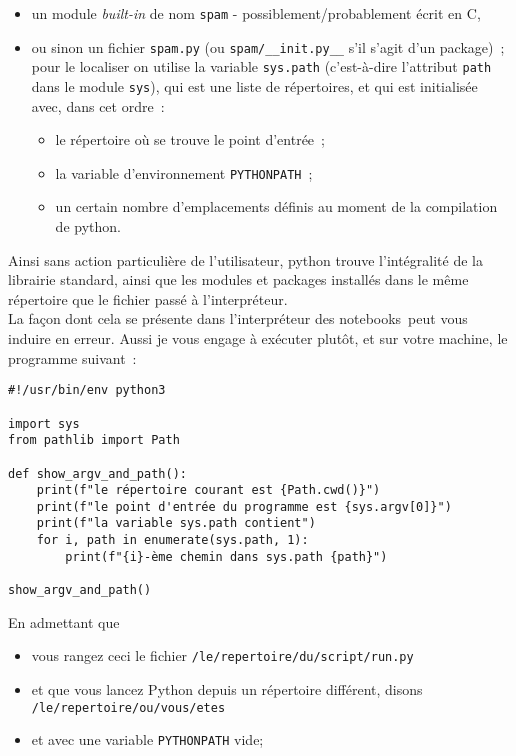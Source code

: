 \begin{itemize}
	\item 
	un module \emph{built-in} de nom
	\texttt{spam} - possiblement/probablement écrit en C,
	\item
	ou sinon un
	fichier \texttt{spam.py} (ou \texttt{spam/\_\_init.py\_\_} s'il s'agit
	d'un package)~; pour le localiser on utilise la variable
	\texttt{sys.path} (c'est-à-dire l'attribut \texttt{path} dans le module
	\texttt{sys}), qui est une liste de répertoires, et qui est initialisée
	avec, dans cet ordre~:
	\begin{itemize}
		\item 
		le répertoire où se trouve le point d'entrée~;
		\item
		la variable d'environnement \texttt{PYTHONPATH}~;
		\item
		un certain nombre
		d'emplacements définis au moment de la compilation de python.
	\end{itemize}
\end{itemize}

    Ainsi sans action particulière de l'utilisateur, python trouve
l'intégralité de la librairie standard, ainsi que les modules et
packages installés dans le même répertoire que le fichier passé à
l'interpréteur.\\

    La façon dont cela se présente dans l'interpréteur des notebooks~peut
vous induire en erreur. Aussi je vous engage à exécuter plutôt, et sur
votre machine, le programme suivant~:

    \begin{verbatim}
#!/usr/bin/env python3

import sys
from pathlib import Path

def show_argv_and_path():
    print(f"le répertoire courant est {Path.cwd()}")
    print(f"le point d'entrée du programme est {sys.argv[0]}")
    print(f"la variable sys.path contient")
    for i, path in enumerate(sys.path, 1):
        print(f"{i}-ème chemin dans sys.path {path}")

show_argv_and_path()
\end{verbatim}

    En admettant que

\begin{itemize}
\tightlist
\item
  vous rangez ceci le fichier \texttt{/le/repertoire/du/script/run.py}
\item
  et que vous lancez Python depuis un répertoire différent, disons
  \texttt{/le/repertoire/ou/vous/etes}
\item
  et avec une variable \texttt{PYTHONPATH} vide;
\end{itemize}

